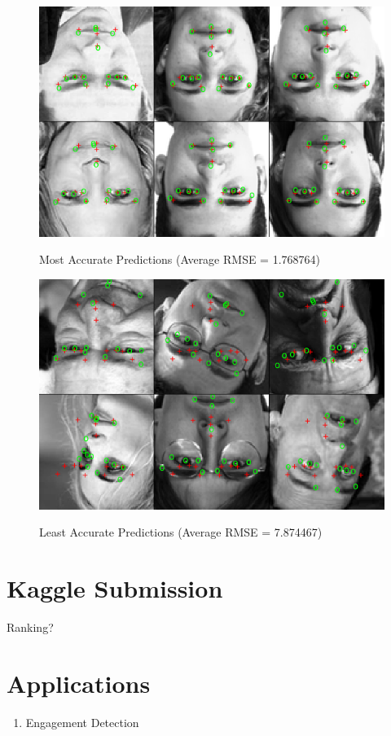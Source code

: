 \documentclass[journal]{IEEEtran}
\begin{document}
\begin{figure}[!htb]
  \centering
  \caption{Most Accurate Predictions (Average RMSE = 1.768764)}
  \includegraphics[scale=.6]{best_faces.pdf}
  \label{fig:best_faces}
\end{figure}

\begin{figure}[!htb]
  \centering
  \caption{Least Accurate Predictions (Average RMSE = 7.874467)}
  \includegraphics[scale=.6]{worst_faces.pdf}
  \label{fig:worst_faces}
\end{figure}

\section{Kaggle Submission}
Ranking?

\section{Applications}
\begin{enumerate}
\item Engagement Detection
\end{enumerate}

\medskip


% 

\end{document}
